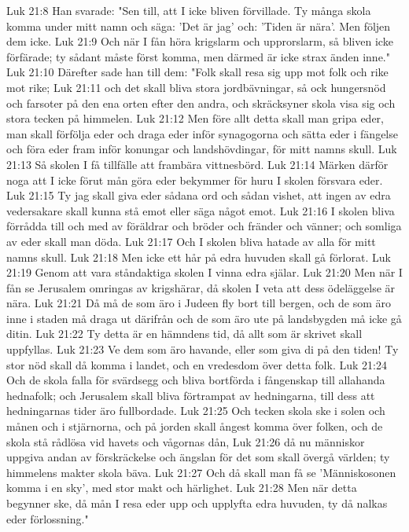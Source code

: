 Luk 21:8  Han svarade: "Sen till, att I icke bliven förvillade. Ty många skola komma under mitt namn och säga: 'Det är jag' och: 'Tiden är nära'. Men följen dem icke.
Luk 21:9  Och när I fån höra krigslarm och upprorslarm, så bliven icke förfärade; ty sådant måste först komma, men därmed är icke strax änden inne."
Luk 21:10  Därefter sade han till dem: "Folk skall resa sig upp mot folk och rike mot rike;
Luk 21:11  och det skall bliva stora jordbävningar, så ock hungersnöd och farsoter på den ena orten efter den andra, och skräcksyner skola visa sig och stora tecken på himmelen.
Luk 21:12  Men före allt detta skall man gripa eder, man skall förfölja eder och draga eder inför synagogorna och sätta eder i fängelse och föra eder fram inför konungar och landshövdingar, för mitt namns skull.
Luk 21:13  Så skolen I få tillfälle att frambära vittnesbörd.
Luk 21:14  Märken därför noga att I icke förut mån göra eder bekymmer för huru I skolen försvara eder.
Luk 21:15  Ty jag skall giva eder sådana ord och sådan vishet, att ingen av edra vedersakare skall kunna stå emot eller säga något emot.
Luk 21:16  I skolen bliva förrådda till och med av föräldrar och bröder och fränder och vänner; och somliga av eder skall man döda.
Luk 21:17  Och I skolen bliva hatade av alla för mitt namns skull.
Luk 21:18  Men icke ett hår på edra huvuden skall gå förlorat.
Luk 21:19  Genom att vara ståndaktiga skolen I vinna edra själar.
Luk 21:20  Men när I fån se Jerusalem omringas av krigshärar, då skolen I veta att dess ödeläggelse är nära.
Luk 21:21  Då må de som äro i Judeen fly bort till bergen, och de som äro inne i staden må draga ut därifrån och de som äro ute på landsbygden må icke gå ditin.
Luk 21:22  Ty detta är en hämndens tid, då allt som är skrivet skall uppfyllas.
Luk 21:23  Ve dem som äro havande, eller som giva di på den tiden! Ty stor nöd skall då komma i landet, och en vredesdom över detta folk.
Luk 21:24  Och de skola falla för svärdsegg och bliva bortförda i fångenskap till allahanda hednafolk; och Jerusalem skall bliva förtrampat av hedningarna, till dess att hedningarnas tider äro fullbordade.
Luk 21:25  Och tecken skola ske i solen och månen och i stjärnorna, och på jorden skall ångest komma över folken, och de skola stå rådlösa vid havets och vågornas dån,
Luk 21:26  då nu människor uppgiva andan av förskräckelse och ängslan för det som skall övergå världen; ty himmelens makter skola bäva.
Luk 21:27  Och då skall man få se 'Människosonen komma i en sky', med stor makt och härlighet.
Luk 21:28  Men när detta begynner ske, då mån I resa eder upp och upplyfta edra huvuden, ty då nalkas eder förlossning."
